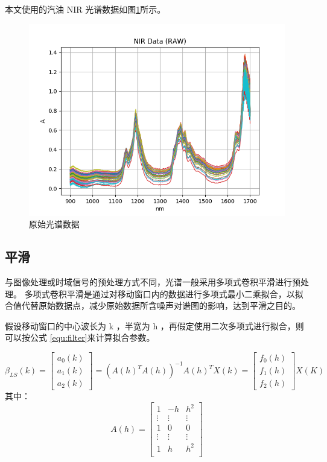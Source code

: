 \documentclass[a4paper, 12pt]{article}
\begin{document}
		本文使用的汽油 NIR 光谱数据如图\ref{fig:nir-data-raw}所示。
		
		\begin{figure}
			\centering
			\includegraphics[width=0.8\linewidth]{../img/raw}
			\caption{原始光谱数据}
			\label{fig:nir-data-raw}
		\end{figure}
	
		\subsection{平滑}\label{section:filter}
			与图像处理或时域信号的预处理方式不同，光谱一般采用多项式卷积平滑进行预处理。
			多项式卷积平滑是通过对移动窗口内的数据进行多项式最小二乘拟合，以拟合值代替原始数据点，减少原始数据所含噪声对谱图的影响，达到平滑之目的。
			
			假设移动窗口的中心波长为 k ，半宽为 h ，再假定使用二次多项式进行拟合，则可以按公式 \eqref{equ:filter}来计算拟合参数。
			
			\begin{equation}\label{equ:filter}
				\beta_{LS}(k) = 
				\begin{bmatrix}
					a_0(k) \\ a_1(k) \\ a_2(k)
				\end{bmatrix}
				= \left( A(h)^TA(h) \right)^{-1}A(h)^TX(k) = 
				\begin{bmatrix}
					f_0(h) \\ f_1(h) \\ f_2(h)
				\end{bmatrix} 
				X(K)
			\end{equation}
			其中：
			\[
				A(h) =
				\begin{bmatrix}
					1 & -h & h^2 \\
					\vdots & \vdots & \vdots \\
					1 & 0 & 0 \\
					\vdots & \vdots & \vdots \\
					1 & h & h^2 \\
				\end{bmatrix} 
			\]
			
\end{document}
